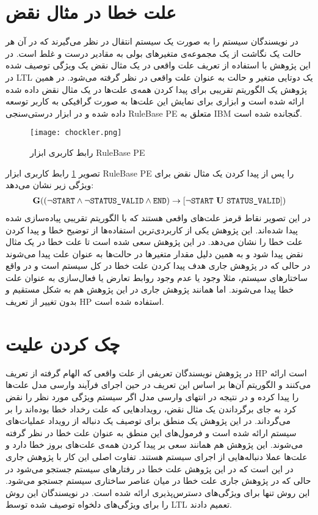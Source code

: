 \section{علت خطا در مثال نقض}
در
\cite{chockler}
نویسندگان سیستم را به صورت یک سیستم انتقال
در نظر می‌گیرند که در آن هر حالت یک نگاشت از یک مجموعه‌ی متغیر‌های بولی به مقادیر درست و غلط است.
در این پژوهش با استفاده از تعریف علت واقعی در یک مثال نقض یک ویژگی توصیف شده در
LTL
یک دوتایی‌ متغیر و حالت به عنوان علت واقعی در نظر گرفته می‌شود.
در همین پژوهش یک الگوریتم تقریبی برای پیدا کردن همه‌ی علت‌ها در یک مثال نقض داده شده ارائه شده است و ابزاری برای نمایش این علت‌ها به صورت گرافیکی به کاربر توسعه داده شده و در ابزار درستی‌سنجی
RuleBase PE
متعلق به
IBM
گنجانده شده است.
\begin{figure}
    \centering
    \texttt{[image: chockler.png]}
    \caption{رابط کاربری ابزار
        RuleBase PE
    }
    \label{fig:rulebase}
\end{figure}
تصویر
\ref{fig:rulebase}
رابط کاربری ابزار 
RuleBase PE
را پس از پیدا کردن یک مثال نقض برای ویژگی زیر نشان می‌دهد:
\begin{align*}
    \boldsymbol{\mr{G}}((\neg \texttt{START} \wedge \neg \texttt{STATUS\_VALID} \wedge \texttt{END}) 
    \ra [\neg \texttt{START}\ \boldsymbol{\mr{U}}\ \texttt{STATUS\_VALID}])
\end{align*}
در این تصویر نقاط قرمز علت‌های واقعی هستند که با الگوریتم تقریبی پیاده‌سازی شده پیدا شده‌اند.
 این پژوهش یکی از کاربردی‌ترین استفاده‌ها از توضیح خطا و پیدا کردن علت خطا را نشان می‌دهد. 
در این پژوهش سعی شده است تا علت خطا در یک مثال نقض پیدا شود و به همین دلیل مقدار متغیر‌ها در حالت‌ها به عنوان علت پیدا می‌شوند در حالی که در پژوهش جاری هدف پیدا کردن علت خطا در کل سیستم است و در واقع ساختار‌های سیستم، مثلا وجود یا عدم وجود روابط تعارض یا فعال‌سازی به عنوان علت خطا پیدا می‌شوند.
اما همانند پژوهش جاری در این پژوهش هم به شکل مستقیم و بدون تغییر از تعریف 
HP
استفاده شده است.

\section{چک کردن علیت}
در پژوهش 
\cite{causality-checking}
نویسندگان تعریفی از علت‌ واقعی که الهام گرفته از تعریف 
HP
است ارائه می‌کنند و الگوریتم آن‌ها بر اساس این تعریف در حین اجرای فرآیند وارسی مدل
علت‌ها را پیدا کرده و در نتیجه در انتهای وارسی مدل اگر سیستم ویژگی مورد نظر را نقض کرد به جای برگرداندن یک مثال نقض، رویداد‌هایی که علت رخداد خطا بوده‌اند را بر می‌گرداند.
در این پژوهش یک منطق برای توصیف یک دنباله از رویداد عملیات‌های سیستم ارائه شده است و فرمول‌های این منطق به عنوان علت خطا در نظر گرفته می‌شوند. 
این پژوهش هم همانند
\cite{chockler}
سعی بر پیدا کردن همه‌ی علت‌های بروز خطا دارد و علت‌ها عملا دنباله‌هایی از اجرای سیستم هستند. 
تفاوت اصلی این کار با پژوهش جاری در این است که در این پژوهش علت خطا در رفتارهای سیستم جستجو می‌شود در حالی که در پژوهش جاری علت خطا در میان عناصر ساختاری سیستم جستجو می‌شود.
این روش تنها برای ویژگی‌های دسترس‌پذیری ارائه شده است.
در
\cite{Caltais-LTL}
نویسندگان این روش‌ را برای ویژگی‌های دلخواه توصیف شده توسط
LTL
تعمیم دادند.

